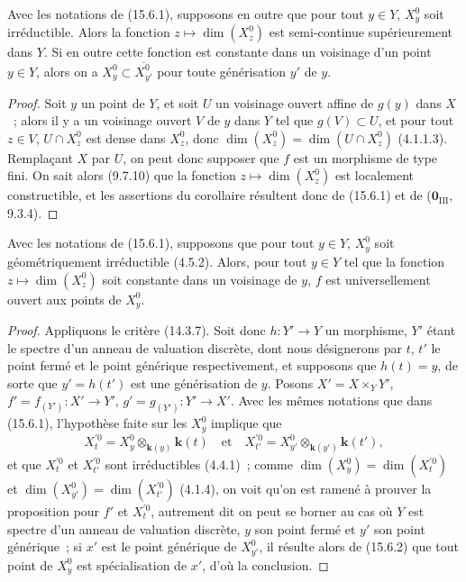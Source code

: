 \begin{corollary}[15.6.2]
Avec les notations de (15.6.1), supposons en outre que pour tout $y\in Y$, $X_y^0$ soit irréductible. Alors la fonction $z\mapsto\dim(X_z^0)$ est semi-continue supérieurement dans $Y$. Si en outre cette fonction est constante dans un voisinage d'un point $y\in Y$, alors on a $X_y^0\subset\overline{X_{y'}^0}$ pour toute générisation $y'$ de $y$.
\end{corollary}

\begin{proof}
Soit $y$ un point de $Y$, et soit $U$ un voisinage ouvert affine de $g(y)$ dans $X$~; alors il y a un voisinage ouvert $V$ de $y$ dans $Y$ tel que $g(V)\subset U$, et pour tout $z\in V$, $U\cap X_z^0$ est dense dans $X_z^0$, donc $\dim(X_z^0)=\dim(U\cap X_z^0)$ (4.1.1.3). Remplaçant $X$ par $U$, on peut donc supposer que $f$ est un morphisme de type fini. On sait alors (9.7.10) que la fonction $z\mapsto\dim(X_z^0)$ est localement constructible, et les assertions du corollaire résultent donc de (15.6.1) et de ($\mathbf{0}_{\mathrm{III}}$, 9.3.4).
\end{proof}

\begin{proposition}[15.6.3]
\label{IV.15.6.3-fr}
Avec les notations de (15.6.1), supposons que pour tout $y\in Y$, $X_y^0$ soit géométriquement irréductible (4.5.2). Alors, pour tout $y\in Y$ tel que la fonction $z\mapsto\dim(X_z^0)$ soit constante dans un voisinage de $y$, $f$ est universellement ouvert aux points de $X_y^0$.
\end{proposition}

\begin{proof}
Appliquons le critère (14.3.7). Soit donc $h:Y'\to Y$ un morphisme, $Y'$ étant le spectre d'un anneau de valuation discrète, dont nous désignerons par $t$, $t'$ le point fermé et le point générique respectivement, et supposons que $h(t)=y$, de sorte que $y'=h(t')$ est une générisation de $y$. Posons $X'=X\times_Y Y'$, $f'=f_{(Y')}:X'\to Y'$, $g'=g_{(Y')}:Y'\to X'$. Avec les mêmes notations que dans (15.6.1), l'hypothèse faite sur les $X_y^0$ implique que
\[
  X_t^{\prime 0}=X_y^0\otimes_{\mathbf{k}(y)}\mathbf{k}(t)
  \quad\text{et}\quad
  X_{t'}^{\prime 0}=X_{y'}^0\otimes_{\mathbf{k}(y')}\mathbf{k}(t'),
\]
et que $X_t^{\prime 0}$ et $X_{t'}^{\prime 0}$ sont irréductibles (4.4.1)~; comme $\dim(X_y^0)=\dim(X_t^{\prime 0})$ et $\dim(X_{y'}^0)=\dim(X_{t'}^{\prime 0})$ (4.1.4), on voit qu'on est ramené à prouver la proposition pour $f'$ et $X_t^{\prime 0}$, autrement dit on peut se borner au cas où $Y$ est spectre d'un anneau de valuation discrète, $y$ son point fermé et $y'$ son point générique~; si $x'$ est le point générique de $X_{y'}^0$, il résulte alors de (15.6.2) que tout point de $X_y^0$ est spécialisation de $x'$, d'où la conclusion.
\end{proof}

